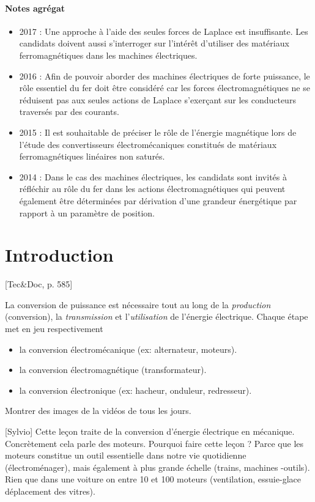 \documentclass[11pt]{report}
\numberwithin{figure}{section}
\numberwithin{equation}{section}
\numberwithin{table}{section}
\newcommand{\1}{\boldsymbol{1}}
\begin{document}
\paragraph{Notes agrégat}
\begin{itemize}
\item 2017 : Une approche à l’aide des seules forces de Laplace est insuffisante. Les candidats doivent aussi s’interroger sur l’intérêt d’utiliser des matériaux ferromagnétiques dans les machines électriques.
\item 2016 : Afin de pouvoir aborder des machines électriques de forte puissance, le rôle essentiel du fer doit être considéré car les forces électromagnétiques ne se réduisent pas aux seules actions de Laplace s’exerçant sur les conducteurs traversés par des courants.
\item 2015 : Il est souhaitable de préciser le rôle de l’énergie magnétique lors de l’étude des convertisseurs
électromécaniques constitués de matériaux ferromagnétiques linéaires non saturés.
\item 2014 : Dans le cas des machines électriques, les candidats sont invités à réfléchir au rôle
du fer dans les actions électromagnétiques qui peuvent également être déterminées par
dérivation d’une grandeur énergétique par rapport à un paramètre de position.
\end{itemize}

\section*{Introduction}

[Tec\&Doc, p. 585]

La conversion de puissance est nécessaire tout au long de la \textit{production} (conversion), la \textit{transmission} et l'\textit{utilisation} de l'énergie électrique. Chaque étape met en jeu respectivement
\begin{itemize}
\item la conversion électromécanique (ex: alternateur, moteurs).
\item la conversion électromagnétique (transformateur).
\item la conversion électronique (ex: hacheur, onduleur, redresseur).
\end{itemize}

Montrer des images de la vidéos de tous les jours.

[Sylvio] Cette leçon traite de la conversion d’énergie électrique en mécanique. Concrètement cela parle des moteurs. Pourquoi faire cette leçon ? Parce que les moteurs constitue un outil essentielle dans notre vie quotidienne (électroménager), mais également à plus grande échelle (trains, machines -outils). Rien que dans une voiture on entre 10 et 100 moteurs (ventilation, essuie-glace déplacement des vitres).
\end{document}
